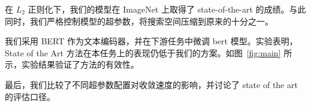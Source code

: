 在 $L_2$ 正则化下，我们的模型在 ImageNet 上取得了 state-of-the-art 的成绩。与此同时，我们严格控制模型的超参数，将搜索空间压缩到原来的十分之一。

我们采用 BERT 作为文本编码器，并在下游任务中微调 bert 模型。实验表明，State of the Art 方法在本任务上的表现仍低于我们的方案。如图~\ref{fig:main} 所示，实验结果验证了方法的有效性。

最后，我们比较了不同超参数配置对收敛速度的影响，并讨论了 state of the art 的评估口径。
